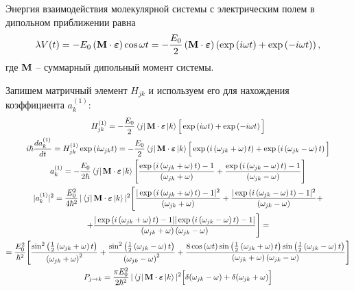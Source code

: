 Энергия взаимодействия молекулярной системы с электрическим полем в дипольном приближении равна
\vverh
\begin{gather}
	\lambda V(t) = - E_0 \left( \mathbf{M} \cdot \boldsymbol{\varepsilon} \right) \cos \omega t = - \frac{E_0}{2} \left( \mathbf{M} \cdot \boldsymbol{\varepsilon} \right) \left( \exp \left( i \omega t \right) + \exp \left( - i \omega t \right) \right) ,\notag
\end{gather}
где $\mathbf{M}$ -- суммарный дипольный момент системы.

Запишем матричный элемент $H_{jk}$  и используем его для нахождения коэффициента $a_k^{(1)}$:
\vverh
\begin{gather}
	H_{jk}^{(1)} = -\frac{E_0}{2} \bra{j} \mathbf{M} \cdot \boldsymbol{\varepsilon} \ket{k} \Big[ \exp \left( i \omega t \right) + \exp \left( - i \omega t \right) \Big] \notag \\
	i \hbar \frac{d a_k^{(1)}}{dt} = H_{jk}^{(1)} \exp \left( i \omega_{jk} t \right) = -\frac{E_0}{2} \bra{j} \mathbf{M} \cdot \boldsymbol{\varepsilon} \ket{k} \Big[ \exp \left( i \left( \omega_{jk} + \omega \right) t \right) + \exp \left( i \left( \omega_{jk} - \omega \right) t \right) \Big] \notag \\
	a_k^{(1)} = - \frac{E_0}{2 \hbar} \bra{j} \mathbf{M} \cdot \boldsymbol{\varepsilon} \ket{k} \Bigg[ \frac{ \exp \left( i \left( \omega_{jk} + \omega \right) t \right) - 1}{\left( \omega_{jk} + \omega \right)} + \frac{\exp \left( i \left( \omega_{jk} - \omega \right) t \right) - 1}{\left( \omega_{jk} - \omega \right)} \Bigg] \notag \\
	| a_k^{(1)} |^2 = \frac{E_0^2}{4 \hbar^2} \, | \bra{j} \mathbf{M} \cdot \boldsymbol{\varepsilon} \ket{k} |^2 \Bigg[ \frac{ | \exp \left( i \left( \omega_{jk} + \omega \right) t \right) - 1 |^2 }{\left( \omega_{jk} + \omega \right) } + \frac{| \exp \left( i \left( \omega_{jk} - \omega \right) t \right)  - 1|^2 }{ \left( \omega_{jk} - \omega \right)}+ \notag \\ 
	+ \frac{|\exp \left( i \left( \omega_{jk} + \omega \right) t \right) - 1 | | \exp \left( i \left( \omega_{jk} - \omega \right) t \right) - 1|}{\left( \omega_{jk} + \omega \right) \left( \omega_{jk} - \omega \right)} \Bigg] = \notag \\
	= \frac{E_0^2}{\hbar^2} \Bigg[ \frac{\sin^2 \left( \frac{1}{2} \left( \omega_{jk} + \omega \right) t \right)}{\left( \omega_{jk} + \omega \right)^2} + \frac{ \sin^2 \left( \frac{1}{2} \left( \omega_{jk} - \omega \right) t \right)}{ \left( \omega_{jk} - \omega \right)^2 } + \frac{8 \cos \left( \omega t \right) \sin \left( \frac{1}{2} \left( \omega_{jk} + \omega \right) t \right) \sin \left( \frac{1}{2} \left( \omega_{jk} - \omega \right) t \right) }{ \left( \omega_{jk} + \omega \right) \left( \omega_{jk} - \omega \right)} \Bigg] \notag \\
	P_{j \rightarrow k} = \frac{\pi E_0^2}{2 \hbar^2} \, | \bra{j} \mathbf{M} \cdot \boldsymbol{\varepsilon} \ket{k} |^2  \Big[ \delta(\omega_{jk} - \omega) + \delta( \omega_{jk} + \omega) \Big] \label{eq:prob}
\end{gather}


